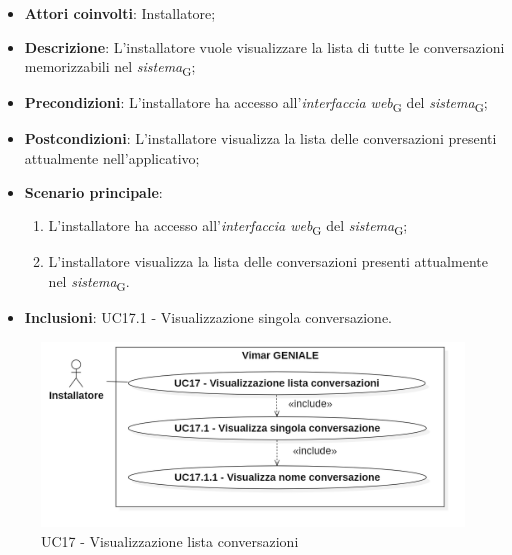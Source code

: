 \begin{itemize}
    \item \textbf{Attori coinvolti}: Installatore;
    \item \textbf{Descrizione}: L'installatore vuole visualizzare la lista di tutte le conversazioni memorizzabili nel \textit{sistema}\textsubscript{G};
    \item \textbf{Precondizioni}: L’installatore ha accesso all’\textit{interfaccia web}\textsubscript{G} del \textit{sistema}\textsubscript{G};
    \item \textbf{Postcondizioni}: L'installatore visualizza la lista delle conversazioni presenti attualmente nell'applicativo;
    \item \textbf{Scenario principale}:
    \begin{enumerate}
        \item L’installatore ha accesso all’\textit{interfaccia web}\textsubscript{G} del \textit{sistema}\textsubscript{G};
        \item L'installatore visualizza la lista delle conversazioni presenti attualmente nel \textit{sistema}\textsubscript{G}.
    \end{enumerate}
    \item \textbf{Inclusioni}: UC17.1 - Visualizzazione singola conversazione.
\end{itemize}
\begin{figure}[H]
\centering
\includegraphics[width=1\textwidth]{contents/casi_duso/png/UC17.png}
\caption{UC17 - Visualizzazione lista conversazioni}
\end{figure}

